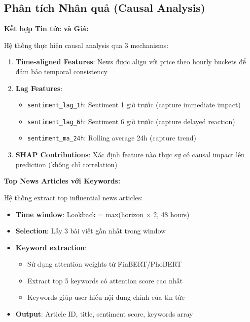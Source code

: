 \subsection{Phân tích Nhân quả (Causal Analysis)}

\noindent\textbf{Kết hợp Tin tức và Giá:}

Hệ thống thực hiện causal analysis qua 3 mechanisms:

\begin{enumerate}
    \item \textbf{Time-aligned Features}: News được align với price theo hourly buckets để đảm bảo temporal consistency
    
    \item \textbf{Lag Features}: 
    \begin{itemize}
        \item \texttt{sentiment\_lag\_1h}: Sentiment 1 giờ trước (capture immediate impact)
        \item \texttt{sentiment\_lag\_6h}: Sentiment 6 giờ trước (capture delayed reaction)
        \item \texttt{sentiment\_ma\_24h}: Rolling average 24h (capture trend)
    \end{itemize}
    
    \item \textbf{SHAP Contributions}: Xác định feature nào thực sự có causal impact lên prediction (không chỉ correlation)
\end{enumerate}

\noindent\textbf{Top News Articles với Keywords:}

Hệ thống extract top influential news articles:

\begin{itemize}
    \item \textbf{Time window}: Lookback = max(horizon × 2, 48 hours)
    \item \textbf{Selection}: Lấy 3 bài viết gần nhất trong window
    \item \textbf{Keyword extraction}: 
    \begin{itemize}
        \item Sử dụng attention weights từ FinBERT/PhoBERT
        \item Extract top 5 keywords có attention score cao nhất
        \item Keywords giúp user hiểu nội dung chính của tin tức
    \end{itemize}
    \item \textbf{Output}: Article ID, title, sentiment score, keywords array
\end{itemize}


